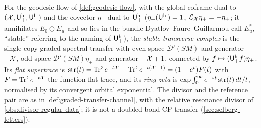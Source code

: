\begin{definition}
\label{def:stable-transverse-complex}
For the geodesic flow of \cref{def:geodesic-flow}, with the global coframe dual to
$(\mathcal X,{\mathsf U^{\mathrm h}_{+}},{\mathsf U^{\mathrm h}_{-}})$ and the covector $\eta_+$ dual to ${\mathsf U^{\mathrm h}_{+}}$ ($\eta_+({\mathsf U^{\mathrm h}_{+}}) = 1$,
$\mathcal L_{\mathcal X}\eta_+ = -\eta_+$; it annihilates $E_0\oplus E_u$ and so lies in the bundle
Dyatlov--Faure--Guillarmou call $E_u^*$, ``stable'' referring to the naming of ${\mathsf U^{\mathrm h}_{+}}$), the \emph{stable transverse complex} is the single-copy
graded spectral transfer with even space $\mathcal D'(SM)$ and generator $-\mathcal X$, odd space
$\mathcal D'(SM)\eta_+$ and generator $-\mathcal X+1$, connected by $f\mapsto({\mathsf U^{\mathrm h}_{+}}f)\eta_+$. Its
\emph{flat supertrace} is $\operatorname{str}(t) = \operatorname{Tr}^{\flat} e^{-t\mathcal X}-\operatorname{Tr}^{\flat} e^{-t(\mathcal X-1)} = (1-e^t)F(t)$
with $F = \operatorname{Tr}^{\flat} e^{-t\mathcal X}$ the function flat trace, and its \emph{ring zeta} is
$\exp\int_0^\infty e^{-st}\operatorname{str}(t)\,dt/t$, normalised by its convergent orbital exponential. The
divisor and the reference pair are as in \cref{def:graded-transfer-channel}, with the relative
resonance divisor of \cref{obs:divisor-regular-data}; it is not a doubled-bond CP transfer
(\cref{sec:selberg-letters}).
\end{definition}

